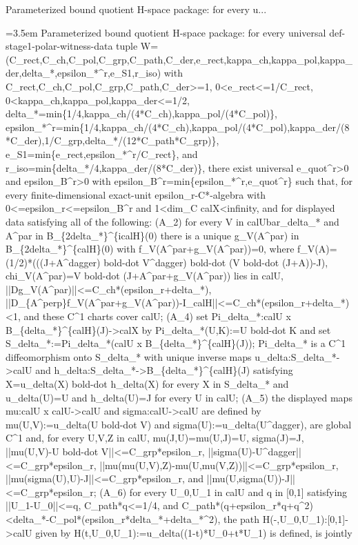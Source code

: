 \documentclass{article}
\newcommand{\step}[1]{\par\noindent\hangindent=3.5em\hangafter=1%
  \makebox[3.5em][l]{\textbf{#1.}}}
\begin{document}
\begin{proofbox}{Parameterized bound quotient H-space package: for every u...}
\step{1} Parameterized bound quotient H-space package: for every universal def-stage1-polar-witness-data tuple W=(C\_rect,C\_ch,C\_pol,C\_grp,C\_path,C\_der,e\_rect,kappa\_ch,kappa\_pol,kappa\_der,delta\_*,epsilon\_*\textasciicircum{}r,e\_S1,r\_iso) with C\_rect,C\_ch,C\_pol,C\_grp,C\_path,C\_der>=1, 0<e\_rect<=1/C\_rect, 0<kappa\_ch,kappa\_pol,kappa\_der<=1/2, delta\_*=min\{1/4,kappa\_ch/(4*C\_ch),kappa\_pol/(4*C\_pol)\}, epsilon\_*\textasciicircum{}r=min\{1/4,kappa\_ch/(4*C\_ch),kappa\_pol/(4*C\_pol),kappa\_der/(8*C\_der),1/C\_grp,delta\_*/(12*C\_path*C\_grp)\}, e\_S1=min\{e\_rect,epsilon\_*\textasciicircum{}r/C\_rect\}, and r\_iso=min\{delta\_*/4,kappa\_der/(8*C\_der)\}, there exist universal e\_quot\textasciicircum{}r>0 and epsilon\_B\textasciicircum{}r>0 with epsilon\_B\textasciicircum{}r=min\{epsilon\_*\textasciicircum{}r,e\_quot\textasciicircum{}r\} such that, for every finite-dimensional exact-unit epsilon\_r-C*-algebra with 0<=epsilon\_r<=epsilon\_B\textasciicircum{}r and 1<dim\_C calX<infinity, and for displayed data satisfying all of the following: (A\_2) for every V in calUbar\_delta\_* and A\textasciicircum{}par in B\_\{2delta\_*\}\textasciicircum{}\{icalH\}(0) there is a unique g\_V(A\textasciicircum{}par) in B\_\{2delta\_*\}\textasciicircum{}\{calH\}(0) with f\_V(A\textasciicircum{}par+g\_V(A\textasciicircum{}par))=0, where f\_V(A)=(1/2)*(((J+A\textasciicircum{}dagger) bold-dot V\textasciicircum{}dagger) bold-dot (V bold-dot (J+A))-J), chi\_V(A\textasciicircum{}par)=V bold-dot (J+A\textasciicircum{}par+g\_V(A\textasciicircum{}par)) lies in calU, ||Dg\_V(A\textasciicircum{}par)||<=C\_ch*(epsilon\_r+delta\_*), ||D\_\{A\textasciicircum{}perp\}f\_V(A\textasciicircum{}par+g\_V(A\textasciicircum{}par))-I\_calH||<=C\_ch*(epsilon\_r+delta\_*)<1, and these C\textasciicircum{}1 charts cover calU; (A\_4) set Pi\_delta\_*:calU x B\_\{delta\_*\}\textasciicircum{}\{calH\}(J)->calX by Pi\_delta\_*(U,K):=U bold-dot K and set S\_delta\_*:=Pi\_delta\_*(calU x B\_\{delta\_*\}\textasciicircum{}\{calH\}(J)); Pi\_delta\_* is a C\textasciicircum{}1 diffeomorphism onto S\_delta\_* with unique inverse maps u\_delta:S\_delta\_*->calU and h\_delta:S\_delta\_*->B\_\{delta\_*\}\textasciicircum{}\{calH\}(J) satisfying X=u\_delta(X) bold-dot h\_delta(X) for every X in S\_delta\_* and u\_delta(U)=U and h\_delta(U)=J for every U in calU; (A\_5) the displayed maps mu:calU x calU->calU and sigma:calU->calU are defined by mu(U,V):=u\_delta(U bold-dot V) and sigma(U):=u\_delta(U\textasciicircum{}dagger), are global C\textasciicircum{}1 and, for every U,V,Z in calU, mu(J,U)=mu(U,J)=U, sigma(J)=J, ||mu(U,V)-U bold-dot V||<=C\_grp*epsilon\_r, ||sigma(U)-U\textasciicircum{}dagger||<=C\_grp*epsilon\_r, ||mu(mu(U,V),Z)-mu(U,mu(V,Z))||<=C\_grp*epsilon\_r, ||mu(sigma(U),U)-J||<=C\_grp*epsilon\_r, and ||mu(U,sigma(U))-J||<=C\_grp*epsilon\_r; (A\_6) for every U\_0,U\_1 in calU and q in [0,1] satisfying ||U\_1-U\_0||<=q, C\_path*q<=1/4, and C\_path*(q+epsilon\_r*q+q\textasciicircum{}2)<delta\_*-C\_pol*(epsilon\_r*delta\_*+delta\_*\textasciicircum{}2), the path H(-,U\_0,U\_1):[0,1]->calU given by H(t,U\_0,U\_1):=u\_delta((1-t)*U\_0+t*U\_1) is defined, is jointly 
\end{proofbox}
\end{document}
